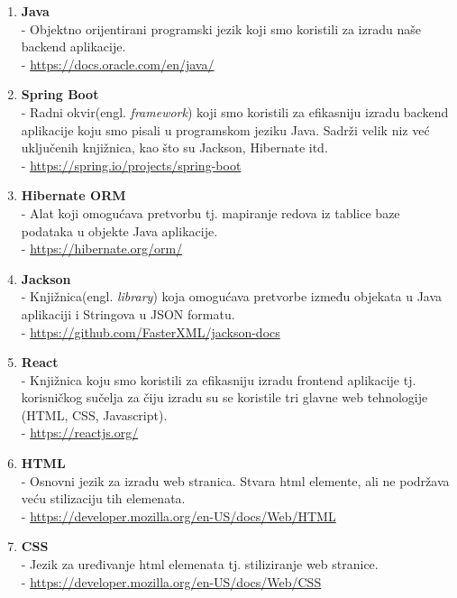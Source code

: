 			\begin{enumerate}
				\item \textbf{Java}\\
				- Objektno orijentirani programski jezik koji smo koristili za izradu naše backend aplikacije.\\
				- \url{https://docs.oracle.com/en/java/}
				
				\item \textbf{Spring Boot}\\
				- Radni okvir(engl. \textit{framework}) koji smo koristili za efikasniju izradu backend aplikacije koju smo pisali u programskom jeziku Java. Sadrži velik niz već uključenih knjižnica, kao što su Jackson, Hibernate itd.\\
				- \url{https://spring.io/projects/spring-boot}
				
				\item \textbf{Hibernate ORM}\\
				- Alat koji omogućava pretvorbu tj. mapiranje redova iz tablice baze podataka u objekte Java aplikacije.\\
				- \url{https://hibernate.org/orm/}
				
				\item \textbf{Jackson}\\
				- Knjižnica(engl. \textit{library}) koja omogućava pretvorbe između objekata u Java aplikaciji i Stringova u JSON formatu.\\
				- \url{https://github.com/FasterXML/jackson-docs}
				
				\item \textbf{React}\\
				- Knjižnica koju smo koristili za efikasniju izradu frontend aplikacije tj. korisničkog sučelja za čiju izradu su se koristile tri glavne web tehnologije (HTML, CSS, Javascript).\\
				- \url{https://reactjs.org/}
				
				\item \textbf{HTML}\\
				- Osnovni jezik za izradu web stranica. Stvara html elemente, ali ne podržava veću stilizaciju tih elemenata.\\
				- \url{https://developer.mozilla.org/en-US/docs/Web/HTML}
				
				\item \textbf{CSS} \\
				- Jezik za uređivanje html elemenata tj. stiliziranje web stranice. \\
				- \url{https://developer.mozilla.org/en-US/docs/Web/CSS}
				

\end{enumerate}
